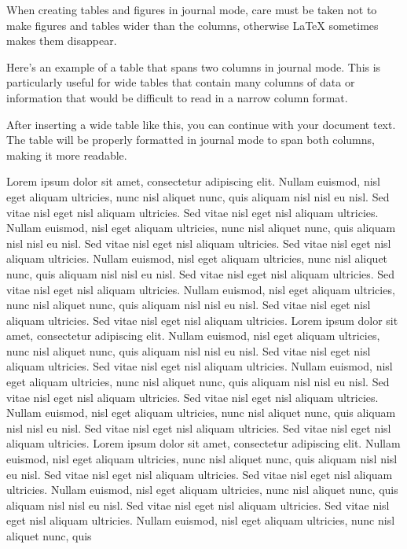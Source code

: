 \documentclass[
  jou,
  floatsintext,
  longtable,
  nolmodern,
  notxfonts,
  notimes,
  colorlinks=true,linkcolor=blue,citecolor=blue,urlcolor=blue]{apa7}
\begin{document}
When creating tables and figures in journal mode, care must be taken not
to make figures and tables wider than the columns, otherwise \LaTeX
sometimes makes them disappear.

Here's an example of a table that spans two columns in journal mode.
This is particularly useful for wide tables that contain many columns of
data or information that would be difficult to read in a narrow column
format.

After inserting a wide table like this, you can continue with your
document text. The table will be properly formatted in journal mode to
span both columns, making it more readable.

Lorem ipsum dolor sit amet, consectetur adipiscing elit. Nullam euismod,
nisl eget aliquam ultricies, nunc nisl aliquet nunc, quis aliquam nisl
nisl eu nisl. Sed vitae nisl eget nisl aliquam ultricies. Sed vitae nisl
eget nisl aliquam ultricies. Nullam euismod, nisl eget aliquam
ultricies, nunc nisl aliquet nunc, quis aliquam nisl nisl eu nisl. Sed
vitae nisl eget nisl aliquam ultricies. Sed vitae nisl eget nisl aliquam
ultricies. Nullam euismod, nisl eget aliquam ultricies, nunc nisl
aliquet nunc, quis aliquam nisl nisl eu nisl. Sed vitae nisl eget nisl
aliquam ultricies. Sed vitae nisl eget nisl aliquam ultricies. Nullam
euismod, nisl eget aliquam ultricies, nunc nisl aliquet nunc, quis
aliquam nisl nisl eu nisl. Sed vitae nisl eget nisl aliquam ultricies.
Sed vitae nisl eget nisl aliquam ultricies. Lorem ipsum dolor sit amet,
consectetur adipiscing elit. Nullam euismod, nisl eget aliquam
ultricies, nunc nisl aliquet nunc, quis aliquam nisl nisl eu nisl. Sed
vitae nisl eget nisl aliquam ultricies. Sed vitae nisl eget nisl aliquam
ultricies. Nullam euismod, nisl eget aliquam ultricies, nunc nisl
aliquet nunc, quis aliquam nisl nisl eu nisl. Sed vitae nisl eget nisl
aliquam ultricies. Sed vitae nisl eget nisl aliquam ultricies. Nullam
euismod, nisl eget aliquam ultricies, nunc nisl aliquet nunc, quis
aliquam nisl nisl eu nisl. Sed vitae nisl eget nisl aliquam ultricies.
Sed vitae nisl eget nisl aliquam ultricies. Lorem ipsum dolor sit amet,
consectetur adipiscing elit. Nullam euismod, nisl eget aliquam
ultricies, nunc nisl aliquet nunc, quis aliquam nisl nisl eu nisl. Sed
vitae nisl eget nisl aliquam ultricies. Sed vitae nisl eget nisl aliquam
ultricies. Nullam euismod, nisl eget aliquam ultricies, nunc nisl
aliquet nunc, quis aliquam nisl nisl eu nisl. Sed vitae nisl eget nisl
aliquam ultricies. Sed vitae nisl eget nisl aliquam ultricies. Nullam
euismod, nisl eget aliquam ultricies, nunc nisl aliquet nunc, quis
\end{document}
